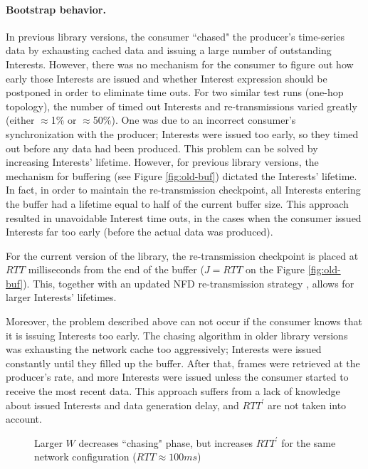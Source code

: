 \documentclass{icn/sig-alternate-2012} %
\begin{document}
\paragraph{Bootstrap behavior.} In previous library versions, the consumer ``chased" the producer's time-series data by exhausting cached data and issuing a large number of outstanding Interests. However, there was no mechanism for the consumer to figure out how early those Interests are issued and whether Interest expression should be postponed in order to eliminate time outs. For two similar test runs (one-hop topology), the number of timed out Interests and re-transmissions varied greatly (either $\approx$1\% or $\approx$50\%). One was due to an incorrect consumer's synchronization with the producer; Interests were issued too early, so they timed out before any data had been produced. This problem can be solved by increasing Interests' lifetime. However, for previous library versions, the mechanism for buffering (see Figure \ref{fig:old-buf}) dictated the Interests' lifetime. In fact, in order to maintain the re-transmission checkpoint, all Interests entering the buffer had a lifetime equal to half of the current buffer size. This approach resulted in unavoidable Interest time outs, in the cases when the consumer issued Interests far too early (before the actual data was produced).

For the current version of the library, the re-transmission checkpoint is placed at $RTT$ milliseconds from the end of the buffer ($J=RTT$ on the Figure \ref{fig:old-buf}). This, together with an updated NFD re-transmission strategy \cite{nfd-rtx-release}, allows for larger Interests' lifetimes.

Moreover, the problem described above can not occur if the consumer knows that it is issuing Interests too early. The chasing algorithm in older library versions was exhausting the network cache too aggressively; Interests were issued constantly until they filled up the buffer. After that, frames were retrieved at the producer's rate, and more Interests were issued unless the consumer started to receive the most recent data. This approach suffers from a lack of knowledge about issued Interests and data generation delay, and $RTT^\prime$ are not taken into account.


\begin{figure}[t!]
\centering
\begin{scriptsize}
\end{scriptsize}
\caption{Larger $W$ decreases ``chasing" phase, but increases $RTT^\prime$ for the same network configuration ($RTT\approx100ms$)}
\label{fig:ws}
\end{figure}
\end{document}
